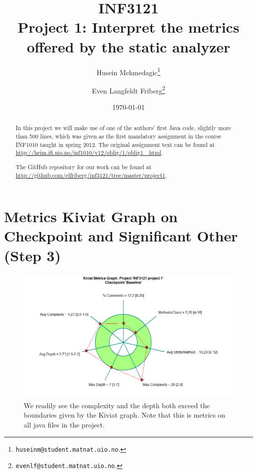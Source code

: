 \documentclass{article}
\begin{document}
\title{INF3121 \\ Project 1: Interpret the metrics offered by the static analyzer}

\author{
Husein Mehmedagic\footnote{\texttt{huseinm@student.matnat.uio.no}.}
\and
Even Langfeldt Friberg\footnote{\texttt{evenlf@student.matnat.uio.no}.}
}

\date{\today}

\maketitle

\renewcommand{\abstractname}{Introduction}
\begin{abstract}
In this project we will make use of one of the authors' first Java code, slightly more than 500 lines, 
which was given as the first mandatory assignment in the course INF1010 taught in spring 2012. The 
original assignment text can be found at \url{http://heim.ifi.uio.no/inf1010/v12/oblig/1/oblig1_.html}.

The GitHub repository for our work can be found at \url{http://github.com/elfriberg/inf3121/tree/master/project1}.
\end{abstract}

\section{Metrics Kiviat Graph on Checkpoint and Significant Other (Step 3)}
\begin{figure}
\includegraphics[scale=0.5]{step3-1_kiviat_Baseline}
\caption{
We readily see the complexity and the depth both exceed the boundaries given by the Kiviat graph. Note that this is metrics on all java files in the 
project.
}
\end{figure}
\end{document}
